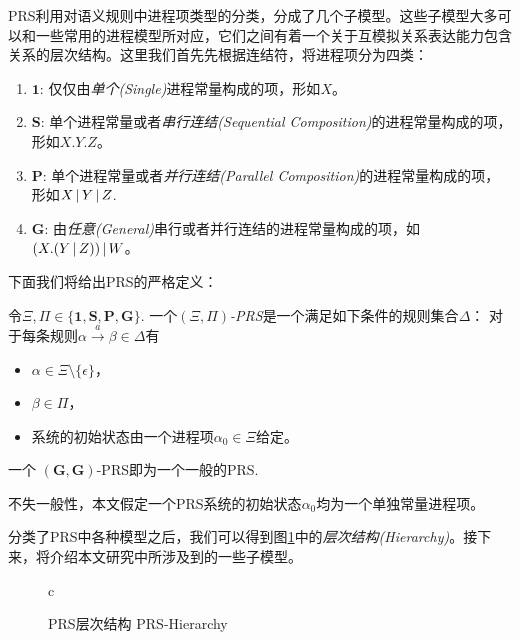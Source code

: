 PRS利用对语义规则中进程项类型的分类，分成了几个子模型。这些子模型大多可以和一些常用的进程模型所对应，它们之间有着一个关于互模拟关系表达能力包含关系的层次结构。这里我们首先先根据连结符，将进程项分为四类：
\begin{enumerate}
    \item $\mathbf{1}$: 仅仅由\emph{单个(Single)}进程常量构成的项，形如$X$。
    \item $\mathbf{S}$: 单个进程常量或者\emph{串行连结(Sequential Composition)}的进程常量构成的项，形如$X.Y.Z$。
    \item $\mathbf{P}$: 单个进程常量或者\emph{并行连结(Parallel Composition)}的进程常量构成的项，形如$X\,|\, Y\,|\, Z$.
    \item $\mathbf{G}$: 由\emph{任意(General)}串行或者并行连结的进程常量构成的项，如 $(X.(Y\,|\, Z))\,|\, W$。
\end{enumerate}
下面我们将给出PRS的严格定义：
\begin{defn}\label{def:prs}
令$\Xi,\Pi\in\{\mathbf{1},\mathbf{S},\mathbf{P},\mathbf{G}\}$.
一个\emph{$(\Xi,\Pi)$-PRS}是一个满足如下条件的规则集合$\Delta$：
对于每条规则$\alpha \stackrel{a}{\longrightarrow} \beta\in \Delta$有
\begin{itemize}
	\item $\alpha\in\Xi\setminus \{\epsilon\}$，
	\item $\beta\in\Pi$，
	\item 系统的初始状态由一个进程项$\alpha_0\in\Xi$给定。
\end{itemize}
一个 $(\mathbf{G},\mathbf{G})$-PRS即为一个一般的PRS.
\end{defn}
不失一般性，本文假定一个PRS系统的初始状态$\alpha_0$均为一个单独常量进程项。

分类了PRS中各种模型之后，我们可以得到图\ref{fig:prs}中的\emph{层次结构(Hierarchy)}。接下来，将介绍本文研究中所涉及到的一些子模型。
\begin{figure}[htdp]
\begin{center}
\begin{tabular}{c}
\end{tabular}
\end{center}
\caption{\textsf{PRS}层次结构 PRS-Hierarchy}
\label{fig:prs}
\end{figure}

